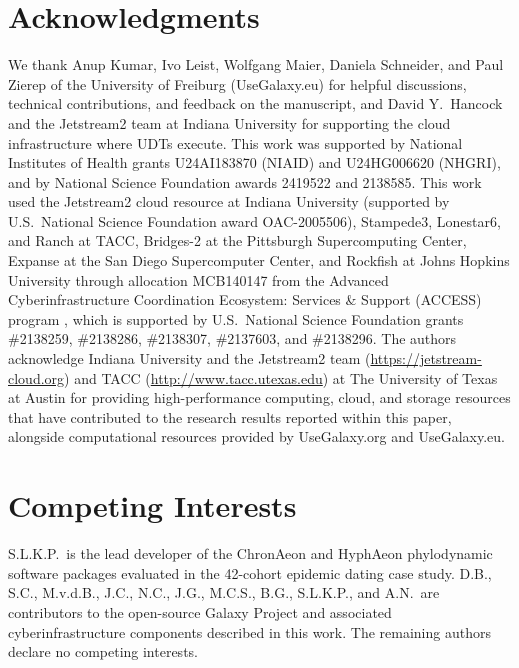 \documentclass[11pt,letterpaper]{article}
\newcommand{\tool}[1]{\textsf{#1}}
\begin{document}
\section*{Acknowledgments}
We thank Anup Kumar, Ivo Leist, Wolfgang Maier, Daniela Schneider, and Paul Zierep of the University of Freiburg (UseGalaxy.eu) for helpful discussions, technical contributions, and feedback on the manuscript, and David Y.\ Hancock and the Jetstream2 team at Indiana University for supporting the cloud infrastructure where UDTs execute. This work was supported by National Institutes of Health grants U24AI183870 (NIAID) and U24HG006620 (NHGRI), and by National Science Foundation awards 2419522 and 2138585. This work used the Jetstream2 cloud resource at Indiana University \cite{hancock2021jetstream2} (supported by U.S.\ National Science Foundation award OAC-2005506), Stampede3, Lonestar6, and Ranch at TACC, Bridges-2 at the Pittsburgh Supercomputing Center, Expanse at the San Diego Supercomputer Center, and Rockfish at Johns Hopkins University through allocation MCB140147 from the Advanced Cyberinfrastructure Coordination Ecosystem: Services \& Support (ACCESS) program \cite{boerner2023access}, which is supported by U.S.\ National Science Foundation grants \#2138259, \#2138286, \#2138307, \#2137603, and \#2138296. The authors acknowledge Indiana University and the Jetstream2 team (\url{https://jetstream-cloud.org}) and TACC (\url{http://www.tacc.utexas.edu}) at The University of Texas at Austin for providing high-performance computing, cloud, and storage resources that have contributed to the research results reported within this paper, alongside computational resources provided by UseGalaxy.org and UseGalaxy.eu.

\section*{Competing Interests}
S.L.K.P.\ is the lead developer of the \tool{ChronAeon} and \tool{HyphAeon} phylodynamic software packages evaluated in the 42-cohort epidemic dating case study. D.B., S.C., M.v.d.B., J.C., N.C., J.G., M.C.S., B.G., S.L.K.P., and A.N.\ are contributors to the open-source Galaxy Project and associated cyberinfrastructure components described in this work. The remaining authors declare no competing interests.
\end{document}
